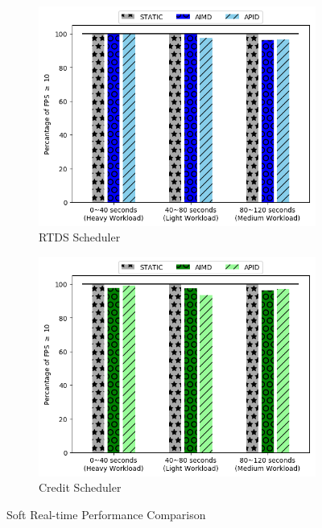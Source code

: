 \begin{itemize}
\begin{figure}[t!]
\centering
\begin{subfigure}{.42\textwidth}
    \centering
    \includegraphics[width=1\linewidth]{images/1vm_rtds_fps}
    \caption{RTDS Scheduler}
    \label{1vm_rtds_fps}
\end{subfigure}
\begin{subfigure}{.42\textwidth}
    \centering
    \includegraphics[width=1\linewidth]{images/1vm_credit_fps}
    \caption{Credit Scheduler}
    \label{1vm_credit_fps}
\end{subfigure}%
\captionsetup{justification=centering}
\caption{Soft Real-time Performance Comparison}
\label{1vm_rtdscredit_fps}
\end{figure}



\end{itemize}
